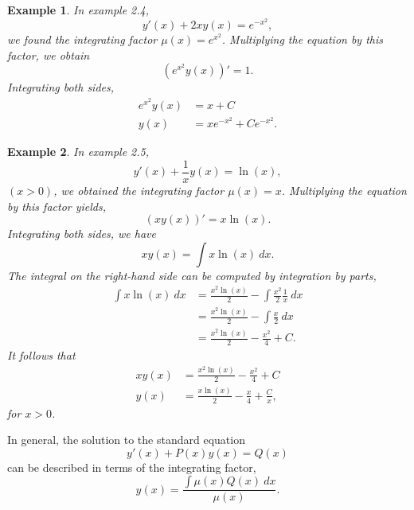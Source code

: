 \documentclass[11pt]{amsart}
\newtheorem{example}{Example}[section]
\numberwithin{equation}{section}
\begin{document}
\begin{example}
In example 2.4, 
\begin{equation*}
y'(x)+2xy(x)=e^{-x^2}, 
\end{equation*}
we found the integrating factor $\mu(x)=e^{x^2}$. Multiplying the equation by this factor, we obtain
\begin{equation*}
(e^{x^2}y(x))'=1.
\end{equation*}
Integrating both sides, 
\begin{align*}
e^{x^2}y(x) & =x+C \\
y(x) &  =xe^{-x^2} + Ce^{-x^2}.
\end{align*}
\end{example}

\begin{example}
In example 2.5, 
\begin{equation*}
y'(x)+\frac{1}{x}y(x)=\ln(x),
\end{equation*}
$(x>0)$, we obtained the integrating factor $\mu(x)=x$. Multiplying the equation by this factor yields, 
\begin{equation*}
(xy(x))' = x\ln(x).
\end{equation*}
Integrating both sides, we have 
\begin{equation}
\label{example5_integrated}
xy(x) = \int x\ln(x) \ dx.
\end{equation}
The integral on the right-hand side can be computed by integration by parts, 
\begin{align*}
\int x\ln(x) \ dx & = \frac{x^2\ln(x)}{2}-\int \frac{x^2}{2}\frac{1}{x} \ dx \\
& = \frac{x^2\ln(x)}{2} -\int \frac{x}{2} \ dx \\
& =  \frac{x^2\ln(x)}{2} -\frac{x^2}{4} + C.
\end{align*}
It follows that 
\begin{align*}
xy(x) & = \frac{x^2\ln(x)}{2} -\frac{x^2}{4} + C \\
y(x) & = \frac{x\ln(x)}{2} -\frac{x}{4} + \frac{C}{x},
\end{align*}
for $x>0$. 
\end{example}

In general, the solution to the standard equation 
\begin{equation*}
y'(x)+P(x)y(x)= Q(x)
\end{equation*}
can be described in terms of the integrating factor, 
\begin{equation}
\label{general_solution}
y(x)=\frac{\int \mu(x) Q(x) \ dx}{\mu(x)}.
\end{equation}
\end{document}
